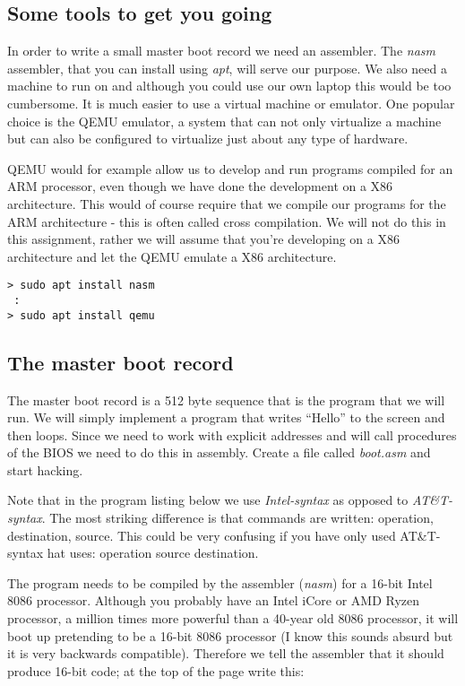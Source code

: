 \documentclass[a4paper,11pt]{article}
\begin{document}
\subsection{Some tools to get you going}

In order to write a small master boot record we need an assembler. The
{\em nasm} assembler, that you can install using {\em apt}, will serve
our purpose. We also need a machine to run on and although you could
use our own laptop this would be too cumbersome. It is much easier to
use a virtual machine or emulator. One popular choice is the QEMU
emulator, a system that can not only virtualize a machine but can also be
configured to virtualize just about any type of hardware.

QEMU would for example allow us to develop and run programs compiled
for an ARM processor, even though we have done the development on a
X86 architecture. This would of course require that we compile our
programs for the ARM architecture - this is often called cross
compilation. We will not do this in this assignment, rather we will
assume that you're developing on a X86 architecture and let the QEMU
emulate a X86 architecture.

\begin{verbatim}
> sudo apt install nasm
 :
> sudo apt install qemu
\end{verbatim}

\subsection{The master boot record}

The master boot record is a 512 byte sequence that is the program that
we will run. We will simply implement a program that writes ``Hello''
to the screen and then loops. Since we need to work with explicit
addresses and will call procedures of the BIOS we need to do this in
assembly. Create a file called {\em boot.asm} and start hacking.

Note that in the program listing below we use {\em Intel-syntax} as
opposed to {\em AT\&T-syntax}. The most striking difference is that
commands are written: operation, destination, source. This could be
very confusing if you have only used AT\&T-syntax hat uses: operation
source destination. 

The program needs to be compiled by the assembler ({\em nasm}) for a
16-bit Intel 8086 processor. Although you probably have an Intel iCore
or AMD Ryzen processor, a million times more powerful than a 40-year
old 8086 processor, it will boot up pretending to be a 16-bit 8086
processor (I know this sounds absurd but it is very backwards
compatible). Therefore we tell the assembler that it should produce
16-bit code; at the top of the page write this:
\end{document}
